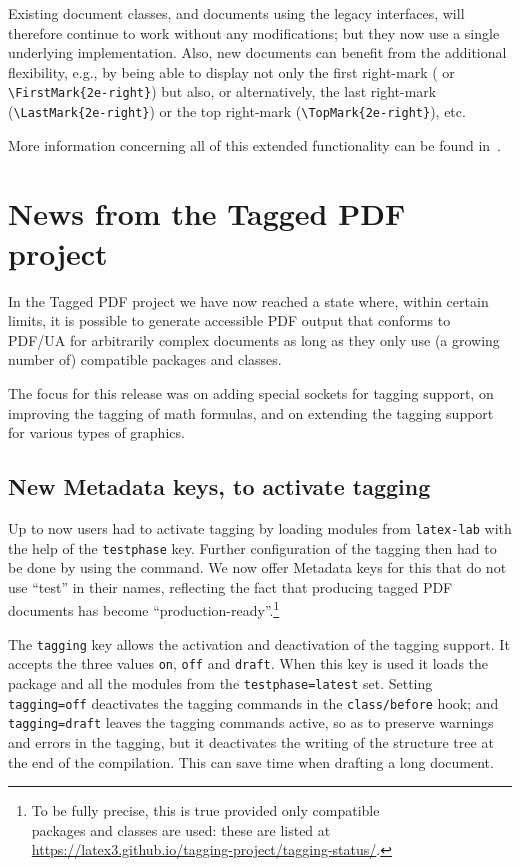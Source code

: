 \documentclass{ltnews}
\begin{document}
Existing document classes, and documents using the legacy interfaces,
will therefore continue to work without any modifications; but they
now use a single underlying implementation. Also, new documents can
benefit from the additional flexibility, e.g., by being able to
display not only the first right-mark ( or
\verb=\FirstMark{2e-right}=) but also, or alternatively, the last
right-mark (\verb=\LastMark{2e-right}=) or the top right-mark
(\verb=\TopMark{2e-right}=), etc.

More information concerning all of this extended functionality can be
found in~\cite{41:ltmarks}.


\section{News from the Tagged PDF project}

In the Tagged PDF project we have now reached a state where, within
certain limits, it is possible to generate accessible PDF output that
conforms to PDF/UA for arbitrarily complex documents as long as they
only use (a growing number of) compatible packages and classes.

The focus for this release was on adding special sockets for tagging
support, on improving the tagging of math formulas, and on extending
the tagging support for various types of graphics.

\subsection{New Metadata keys, to activate tagging}

Up to now users had to activate tagging by loading modules from
\texttt{latex-lab} with the help of the \texttt{testphase}
key. Further configuration of the tagging then had to be done by using
the  command.  We now offer Metadata keys for this
that do not use \enquote{test} in their names, reflecting the fact
that producing tagged PDF documents has become
\enquote{production-ready}.\footnote{To be fully precise, this is true
provided only compatible\\
packages and classes are used: these are listed at\\
\url{https://latex3.github.io/tagging-project/tagging-status/}.}

The \texttt{tagging} key allows the activation and deactivation of the
tagging support.  It accepts the three values \texttt{on},
\texttt{off} and \texttt{draft}.  When this key is used it loads the
 package and all the modules from the
\texttt{testphase=latest} set.  Setting \texttt{tagging=off}
deactivates the tagging commands in the \texttt{class/before} hook;
and \texttt{tagging=draft} leaves the tagging commands active, so as
to preserve warnings and errors in the tagging, but it deactivates the
writing of the structure tree at the end of the compilation. This can
save time when drafting a long document.
\end{document}
